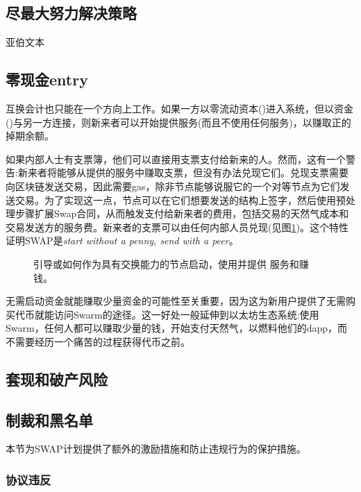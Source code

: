 \subsection{尽最大努力解决策略}

亚伯文本

\subsection{零现金entry\statusgreen}\label{sec:zero-cash-entry}


互换会计也只能在一个方向上工作。如果一方以零流动资本()进入系统，但以资金()与另一方连接，则新来者可以开始提供服务(而且不使用任何服务)，以赚取正的掉期余额。

如果内部人士有支票簿，他们可以直接用支票支付给新来的人。然而，这有一个警告:新来者将能够从提供的服务中赚取支票，但没有办法兑现它们。兑现支票需要向区块链发送交易，因此需要gas，除非节点能够说服它的一个对等节点为它们发送交易。为了实现这一点，节点可以在它们想要发送的结构上签字，然后使用预处理步骤扩展Swap合同，从而触发支付给新来者的费用，包括交易的天然气成本和交易发送方的服务费。新来者的支票可以由任何内部人员兑现(见图\ref{fig:zero-cash-entry})。这个特性证明SWAP是\emph{start without a penny, send with a peer}。

\begin{figure}[htbp]
\centering

\caption[零现金条目\statusorange]{引导或如何作为具有交换能力的节点启动，使用并提供
服务和赚钱。}
\label{fig:zero-cash-entry}
\end{figure}

无需启动资金就能赚取少量资金的可能性至关重要，因为这为新用户提供了无需购买代币就能访问Swarm的途径。这一好处一般延伸到以太坊生态系统:使用Swarm，任何人都可以赚取少量的钱，开始支付天然气，以燃料他们的dapp，而不需要经历一个痛苦的过程获得代币之前。 


\subsection{套现和破产风险}



\subsection{制裁和黑名单\statusgreen}\label{sec:sanctions}
\red{}

本节为SWAP计划提供了额外的激励措施和防止违规行为的保护措施。 

\subsubsection{协议违反}

